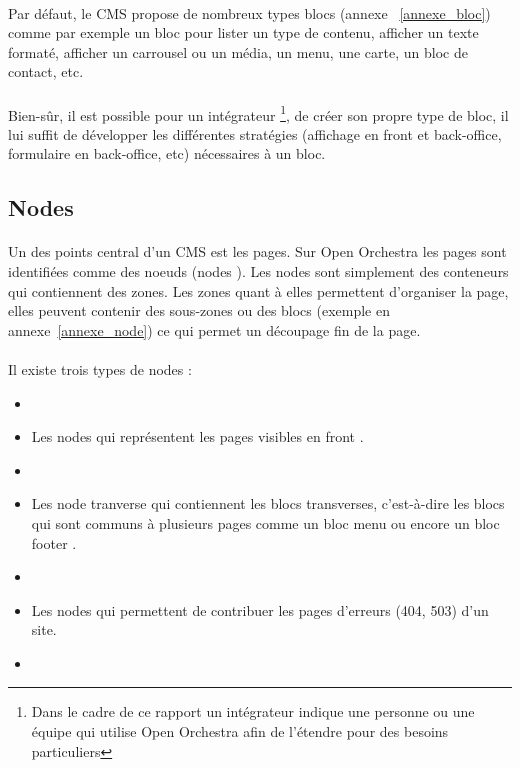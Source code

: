 	      	\paragraph{}
	      	Par défaut, le CMS propose de nombreux types blocs (annexe ~\ref{annexe_bloc}) comme par exemple un bloc pour lister un type de contenu, afficher un texte formaté, afficher un carrousel ou un média, un menu, une carte, un bloc de contact, etc.
	      \paragraph{}
	      	 Bien-sûr, il est possible pour un intégrateur \footnote{Dans le cadre de ce rapport un intégrateur indique une personne ou une équipe qui utilise Open Orchestra afin de l'étendre pour des besoins particuliers}, de créer son propre type de bloc, il lui suffit de développer les différentes stratégies (affichage en front et back-office, formulaire en back-office, etc) nécessaires à un bloc.  
         \subsection{Nodes}
         \paragraph{}
         Un des points central d'un CMS est les pages. Sur Open Orchestra les pages sont identifiées comme des noeuds (\og nodes \fg{}).
          Les nodes sont simplement des conteneurs qui contiennent des zones. Les zones quant à elles permettent d'organiser la page, elles peuvent contenir des sous-zones ou des blocs (exemple en annexe~\ref{annexe_node}) ce qui permet un découpage fin de la page. 
         \paragraph{}
         Il existe trois types de nodes : 
         \begin{itemize}
         \item[]
         \item  Les nodes qui représentent les pages visibles en \og front \fg{}.
          \item[]
         \item  Les \og node tranverse \fg{} qui contiennent les blocs transverses, c'est-à-dire les blocs qui sont communs à plusieurs pages comme un bloc \og menu \fg{} ou encore un bloc \og footer \fg{}.
          \item[]
         \item Les nodes qui permettent de contribuer les pages d'erreurs (404, 503) d'un site.
         \item[]
         \end{itemize}
